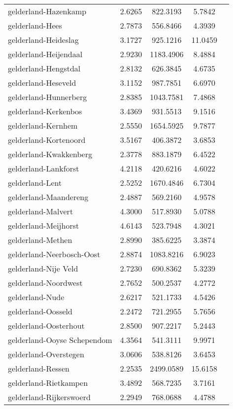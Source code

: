 \begin{longtable}{llccc}
gelderland-Hazenkamp & 2.6265 & 822.3193 & 5.7842 \\
gelderland-Hees & 2.7873 & 556.8466 & 4.3939 \\
gelderland-Heideslag & 3.1727 & 925.1216 & 11.0459 \\
gelderland-Heijendaal & 2.9230 & 1183.4906 & 8.4884 \\
gelderland-Hengstdal & 2.8132 & 626.3845 & 4.6735 \\
gelderland-Heseveld & 3.1152 & 987.7851 & 6.6970 \\
gelderland-Hunnerberg & 2.8385 & 1043.7581 & 7.4868 \\
gelderland-Kerkenbos & 3.4369 & 931.5513 & 9.1516 \\
gelderland-Kernhem & 2.5550 & 1654.5925 & 9.7877 \\
gelderland-Kortenoord & 3.5167 & 406.3872 & 3.6853 \\
gelderland-Kwakkenberg & 2.3778 & 883.1879 & 6.4522 \\
gelderland-Lankforst & 4.2118 & 420.6216 & 4.6022 \\
gelderland-Lent & 2.5252 & 1670.4846 & 6.7304 \\
gelderland-Maandereng & 2.4887 & 569.2160 & 4.9578 \\
gelderland-Malvert & 4.3000 & 517.8930 & 5.0788 \\
gelderland-Meijhorst & 4.6143 & 523.7948 & 4.3021 \\
gelderland-Methen & 2.8990 & 385.6225 & 3.3874 \\
gelderland-Neerbosch-Oost & 2.8874 & 1083.8216 & 6.9023 \\
gelderland-Nije Veld & 2.7230 & 690.8362 & 5.3239 \\
gelderland-Noordwest & 2.7652 & 500.2537 & 4.2772 \\
gelderland-Nude & 2.6217 & 521.1733 & 4.5426 \\
gelderland-Oosseld & 2.2472 & 721.2955 & 5.7656 \\
gelderland-Oosterhout & 2.8500 & 907.2217 & 5.2443 \\
gelderland-Ooyse Schependom & 4.3564 & 541.3111 & 9.9971 \\
gelderland-Overstegen & 3.0606 & 538.8126 & 3.6453 \\
gelderland-Ressen & 2.2535 & 2499.0589 & 15.6158 \\
gelderland-Rietkampen & 3.4892 & 568.7235 & 3.7161 \\
gelderland-Rijkerswoerd & 2.2949 & 768.0688 & 4.4788 \\

\end{longtable}
